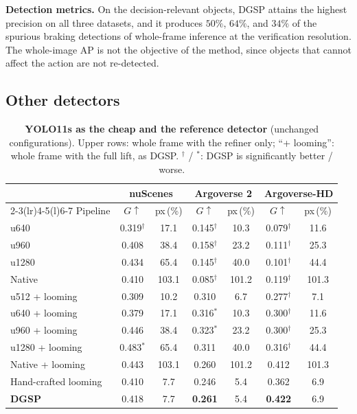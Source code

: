 \documentclass[10pt,letterpaper]{article}
\newcommand{\method}{DGSP\xspace}
\newcommand{\G}{G}
\newcommand{\best}[1]{\textbf{#1}}
\newcommand{\oursrow}{\rowcolor{oursbg}}
\theoremstyle{remark}
\theoremstyle{plain}
\theoremstyle{definition}
\begin{document}
\noindent\textbf{Detection metrics.}
On the decision-relevant objects, \method attains the highest precision on all three datasets, and it produces $50\%$, $64\%$, and $34\%$ of the spurious braking detections of whole-frame inference at the verification resolution.
The whole-image AP is not the objective of the method, since objects that cannot affect the action are not re-detected.

\subsection{Other detectors}
\label{sec:supp_detectors}

\begin{table}[!tbp]
\centering
\caption{\textbf{YOLO11s as the cheap and the reference detector} (unchanged configurations). Upper rows: whole frame with the refiner only; ``+ looming'': whole frame with the full lift, as \method. $^{\dagger}$ / $^{\ast}$: \method is significantly better / worse.}
\label{tab:det2}
\small
\setlength{\tabcolsep}{3pt}
\begin{tabular}{@{}lcccccc@{}}
\toprule
 & \multicolumn{2}{c}{nuScenes} & \multicolumn{2}{c}{Argoverse 2} & \multicolumn{2}{c}{Argoverse-HD} \\
\cmidrule(lr){2-3}\cmidrule(lr){4-5}\cmidrule(l){6-7}
Pipeline & $\G\uparrow$ & px\,(\%) & $\G\uparrow$ & px\,(\%) & $\G\uparrow$ & px\,(\%) \\
\midrule
u640 & 0.319$^{\dagger}$ & 17.1 & 0.145$^{\dagger}$ & 10.3 & 0.079$^{\dagger}$ & 11.6 \\
u960 & 0.408 & 38.4 & 0.158$^{\dagger}$ & 23.2 & 0.111$^{\dagger}$ & 25.3 \\
u1280 & 0.434 & 65.4 & 0.145$^{\dagger}$ & 40.0 & 0.101$^{\dagger}$ & 44.4 \\
Native & 0.410 & 103.1 & 0.085$^{\dagger}$ & 101.2 & 0.119$^{\dagger}$ & 101.3 \\
\midrule
u512 + looming & 0.309 & 10.2 & 0.310 & 6.7 & 0.277$^{\dagger}$ & 7.1 \\
u640 + looming & 0.379 & 17.1 & 0.316$^{\ast}$ & 10.3 & 0.300$^{\dagger}$ & 11.6 \\
u960 + looming & 0.446 & 38.4 & 0.323$^{\ast}$ & 23.2 & 0.300$^{\dagger}$ & 25.3 \\
u1280 + looming & 0.483$^{\ast}$ & 65.4 & 0.311 & 40.0 & 0.316$^{\dagger}$ & 44.4 \\
Native + looming & 0.443 & 103.1 & 0.260 & 101.2 & 0.412 & 101.3 \\
\midrule
Hand-crafted looming & 0.410 & 7.7 & 0.246 & 5.4 & 0.362 & 6.9 \\
\oursrow \textbf{\method} & 0.418 & 7.7 & \best{0.261} & 5.4 & \best{0.422} & 6.9 \\
\bottomrule
\end{tabular}
\end{table}
\end{document}
